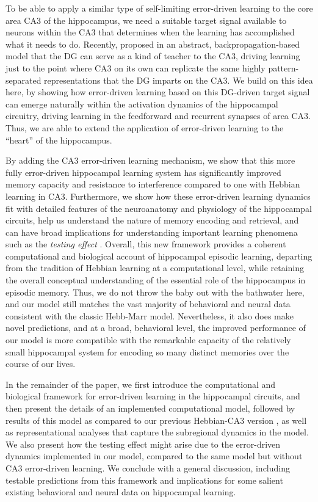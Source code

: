 \documentclass[10pt,letterpaper]{article}
\begin{document}
To be able to apply a similar type of self-limiting error-driven learning to the core area CA3 of the hippocampus, we need a suitable target signal available to neurons within the CA3 that determines when the learning has accomplished what it needs to do.  Recently, \cite{KowadloAhmedRawlinson20} proposed in an abstract, backpropagation-based model that the DG can serve as a kind of teacher to the CA3, driving learning just to the point where CA3 on its own can replicate the same highly pattern-separated representations that the DG imparts on the CA3.  We build on this idea here, by showing how error-driven learning based on this DG-driven target signal can emerge naturally within the activation dynamics of the hippocampal circuitry, driving learning in the feedforward and recurrent synapses of area CA3.  Thus, we are able to extend the application of error-driven learning to the ``heart'' of the hippocampus.

By adding the CA3 error-driven learning mechanism, we show that this more fully error-driven hippocampal learning system has significantly improved memory capacity and resistance to interference compared to one with Hebbian learning in CA3.  Furthermore, we show how these error-driven learning dynamics fit with detailed features of the neuroanatomy and physiology of the hippocampal circuits, help us understand the nature of memory encoding and retrieval, and can have broad implications for understanding important learning phenomena such as the \emph{testing effect} \cite{LiuOReillyRanganath21}.  Overall, this new framework provides a coherent computational and biological account of hippocampal episodic learning, departing from the tradition of Hebbian learning at a computational level, while retaining the overall conceptual understanding of the essential role of the hippocampus in episodic memory.  Thus, we do not throw the baby out with the bathwater here, and our model still matches the vast majority of behavioral and neural data consistent with the classic Hebb-Marr model.  Nevertheless, it also does make novel predictions, and at a broad, behavioral level, the improved performance of our model is more compatible with the remarkable capacity of the relatively small hippocampal system for encoding so many distinct memories over the course of our lives.

In the remainder of the paper, we first introduce the computational and biological framework for error-driven learning in the hippocampal circuits, and then present the details of an implemented computational model, followed by results of this model as compared to our previous Hebbian-CA3 version \cite{KetzMorkondaOReilly13}, as well as representational analyses that capture the subregional dynamics in the model.  We also present how the testing effect might arise due to the error-driven dynamics implemented in our model, compared to the same model but without CA3 error-driven learning.  We conclude with a general discussion, including testable predictions from this framework and implications for some salient existing behavioral and neural data on hippocampal learning.
\end{document}
